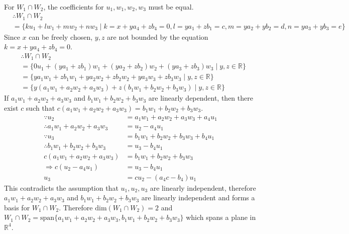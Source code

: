 \documentclass[10pt]{article}
\begin{document}
{{\begin{align}
		\end{align}
		For $W_1 \cap W_2$, the coefficients for $u_1, w_1, w_2, w_3$ must be equal.
		\begin{align}
			&\therefore W_1 \cap W_2  \\
			&= \{ku_1 + lw_1 + mw_2 + nw_3 \mid k = x + ya_4 + zb_4 = 0, l = ya_1 + zb_1 = c, m = ya_2 + yb_2 = d, n = ya_3 + yb_3 = e\}
		\end{align}
		Since $x$ can be freely chosen, $y, z$ are not bounded by the equation $k = x + ya_4 + zb_4 = 0$.
		\begin{align}
			&\therefore W_1 \cap W_2 \\
			&= \{0u_1 + (ya_1 + zb_1)w_1 + (ya_2 + zb_2)w_2 + (ya_3 + zb_3)w_3 \mid y, z \in \mathbb{R}\} \\
			&= \{ya_1w_1 + zb_1w_1 + ya_2w_2 + zb_2w_2 + ya_3w_3 + zb_3w_3 \mid y, z \in \mathbb{R}\} \\
			&= \{y(a_1w_1 + a_2w_2 + a_3w_3) + z(b_1w_1 + b_2w_2 + b_3w_3) \mid y, z \in \mathbb{R}\}
		\end{align}
		If $a_1w_1 + a_2w_2 + a_3w_3$ and $b_1w_1 + b_2w_2 + b_3w_3$ are linearly 
		dependent, then there exist $c$ such that $c(a_1w_1 + a_2w_2 + a_3w_3) = 
		b_1w_1 + b_2w_2 + b_3w_3$.
		\begin{align}
			\because u_2 &= a_1w_1 + a_2w_2 + a_3w_3 + a_4u_1 \\
			\therefore a_1w_1 + a_2w_2 + a_3w_3 &= u_2 - a_4u_1 \\
			\because u_3 &= b_1w_1 + b_2w_2 + b_3w_3 + b_4u_1 \\
			\therefore b_1w_1 + b_2w_2 + b_3w_3 &= u_3 - b_4u_1 \\
			c(a_1w_1 + a_2w_2 + a_3w_3) &= b_1w_1 + b_2w_2 + b_3w_3 \\
			\Rightarrow c(u_2 - a_4u_1) &= u_3 - b_4u_1\\
			u_3 &= cu_2 - (a_4c - b_4)u_1
		\end{align}
		This contradicts the assumption that $u_1, u_2, u_3$ are linearly independent,
		therefore $a_1w_1 + a_2w_2 + a_3w_3$ and $b_1w_1 + b_2w_2 + b_3w_3$ are linearly 
		independent and forms a basis for $W_1 \cap W_2$. Therefore $\text{dim} (W_1 \cap W_2) = 2$
		and $W_1 \cap W_2 = \text{span}\{a_1w_1 + a_2w_2 + a_3w_3, b_1w_1 + b_2w_2 + b_3w_3\}$
		which spans a plane in $\mathbb{R}^4$.

	}
}
\end{document}
